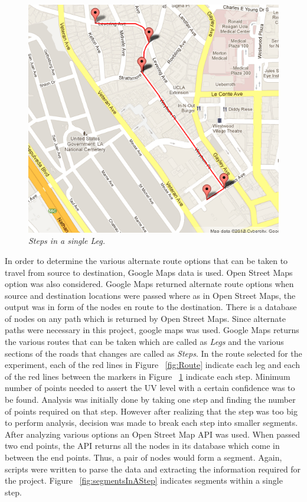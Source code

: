\documentclass[10pt]{sigplan-proc-varsize}
\begin{document}
\begin{figure}
\begin{center}
\includegraphics[scale=0.35]{stepsInALeg.png}
\caption{\small \sl Steps in a single Leg.\label{fig:stepsInALeg}}
\end{center}
\end{figure}

In order to determine the various alternate route options that can be taken to travel from source to destination, Google Maps \cite{googleMapsOriginal} data is used. Open Street Maps option was also considered. Google Maps returned alternate route options when source and destination locations were passed where as in Open Street Maps, the output was in form of the nodes en route to the destination. There is a database of nodes on any path which is returned by Open Street Maps. Since alternate paths were necessary in this project, google maps was used. Google Maps returns the various routes that can be taken which are called as {\it Legs} and the various sections of the roads that changes are called as {\it Steps}. In the route selected for the experiment, each of the red lines in Figure ~\ref{fig:Route} indicate each leg and each of the red lines between the markers in Figure ~\ref{fig:stepsInALeg} indicate each step. Minimum number of points needed to assert the UV level with a certain confidence was to be found. Analysis was initially done by taking one step and finding the number of points required on that step. However after realizing that the step was too big to perform analysis, decision was made to break each step into smaller segments. After analyzing various options an Open Street Map API  \cite{openStreetMapsDirections} was used. When passed two end points, the API returns all the nodes in its database which come in between the end points. Thus, a pair of nodes would form a segment. Again, scripts were written to parse the data and extracting the information required for the project. Figure ~\ref{fig:segmentsInAStep} indicates segments within a single step. 
\end{document}
